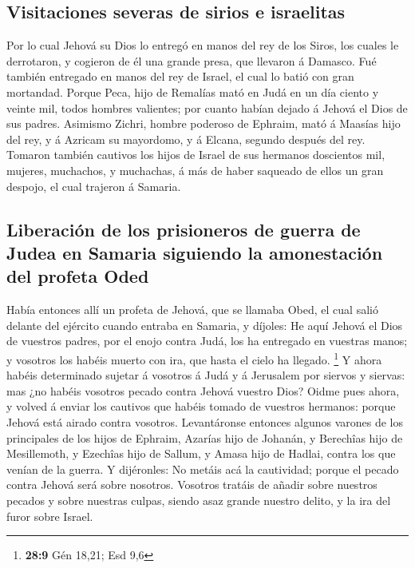 \hypertarget{visitaciones-severas-de-sirios-e-israelitas}{%
\subsection{Visitaciones severas de sirios e
israelitas}\label{visitaciones-severas-de-sirios-e-israelitas}}

 Por lo cual Jehová su Dios lo entregó en manos del rey de
los Siros, los cuales le derrotaron, y cogieron de él una grande presa,
que llevaron á Damasco. Fué también entregado en manos del rey de
Israel, el cual lo batió con gran mortandad.  Porque Peca,
hijo de Remalías mató en Judá en un día ciento y veinte mil, todos
hombres valientes; por cuanto habían dejado á Jehová el Dios de sus
padres.  Asimismo Zichri, hombre poderoso de Ephraim, mató
á Maasías hijo del rey, y á Azricam su mayordomo, y á Elcana, segundo
después del rey.  Tomaron también cautivos los hijos de
Israel de sus hermanos doscientos mil, mujeres, muchachos, y muchachas,
á más de haber saqueado de ellos un gran despojo, el cual trajeron á
Samaria.

\hypertarget{liberaciuxf3n-de-los-prisioneros-de-guerra-de-judea-en-samaria-siguiendo-la-amonestaciuxf3n-del-profeta-oded}{%
\subsection{Liberación de los prisioneros de guerra de Judea en Samaria
siguiendo la amonestación del profeta
Oded}\label{liberaciuxf3n-de-los-prisioneros-de-guerra-de-judea-en-samaria-siguiendo-la-amonestaciuxf3n-del-profeta-oded}}

 Había entonces allí un profeta de Jehová, que se llamaba
Obed, el cual salió delante del ejército cuando entraba en Samaria, y
díjoles: He aquí Jehová el Dios de vuestros padres, por el enojo contra
Judá, los ha entregado en vuestras manos; y vosotros los habéis muerto
con ira, que hasta el cielo ha llegado. \footnote{\textbf{28:9} Gén
  18,21; Esd 9,6}  Y ahora habéis determinado sujetar á
vosotros á Judá y á Jerusalem por siervos y siervas: mas ¿no habéis
vosotros pecado contra Jehová vuestro Dios?  Oidme pues
ahora, y volved á enviar los cautivos que habéis tomado de vuestros
hermanos: porque Jehová está airado contra vosotros. 
Levantáronse entonces algunos varones de los principales de los hijos de
Ephraim, Azarías hijo de Johanán, y Berechîas hijo de Mesillemoth, y
Ezechîas hijo de Sallum, y Amasa hijo de Hadlai, contra los que venían
de la guerra.  Y dijéronles: No metáis acá la cautividad;
porque el pecado contra Jehová será sobre nosotros. Vosotros tratáis de
añadir sobre nuestros pecados y sobre nuestras culpas, siendo asaz
grande nuestro delito, y la ira del furor sobre Israel.

